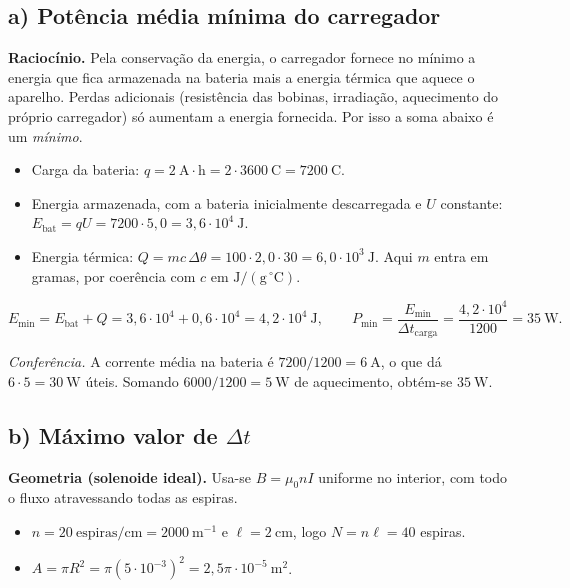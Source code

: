 \documentclass{article}%
\begin{document}
\subsection*{a) Potência média mínima do carregador}

\textbf{Raciocínio.} Pela conservação da energia, o carregador fornece no mínimo a energia que fica armazenada na bateria mais a energia térmica que aquece o aparelho. Perdas adicionais (resistência das bobinas, irradiação, aquecimento do próprio carregador) só aumentam a energia fornecida. Por isso a soma abaixo é um \emph{mínimo}.

\begin{itemize}
\item Carga da bateria: $q = 2\ \mathrm{A\cdot h} = 2\cdot 3600\ \mathrm{C} = 7200\ \mathrm{C}$.
\item Energia armazenada, com a bateria inicialmente descarregada e $U$ constante: $E_{\text{bat}} = qU = 7200\cdot 5{,}0 = 3{,}6\cdot 10^{4}\ \mathrm{J}$.
\item Energia térmica: $Q = mc\,\Delta\theta = 100\cdot 2{,}0\cdot 30 = 6{,}0\cdot 10^{3}\ \mathrm{J}$. Aqui $m$ entra em gramas, por coerência com $c$ em $\mathrm{J/(g\,^\circ C)}$.
\end{itemize}

\[
E_{\min}=E_{\text{bat}}+Q = 3{,}6\cdot10^{4}+0{,}6\cdot10^{4}=4{,}2\cdot 10^{4}\ \mathrm{J},
\qquad
P_{\min}=\frac{E_{\min}}{\Delta t_{\text{carga}}}=\frac{4{,}2\cdot 10^{4}}{1200}=35\ \mathrm{W}.
\]

\emph{Conferência.} A corrente média na bateria é $7200/1200=6\ \mathrm{A}$, o que dá $6\cdot 5=30\ \mathrm{W}$ úteis. Somando $6000/1200=5\ \mathrm{W}$ de aquecimento, obtém-se $35\ \mathrm{W}$.

\subsection*{b) Máximo valor de $\Delta t$}

\textbf{Geometria (solenoide ideal).} Usa-se $B=\mu_0 nI$ uniforme no interior, com todo o fluxo atravessando todas as espiras.

\begin{itemize}
\item $n=20\ \mathrm{espiras/cm}=2000\ \mathrm{m^{-1}}$ e $\ell=2\ \mathrm{cm}$, logo $N=n\ell=40$ espiras.
\item $A=\pi R^{2}=\pi(5\cdot 10^{-3})^{2}=2{,}5\pi\cdot10^{-5}\ \mathrm{m^{2}}$.
\end{itemize}
\end{document}
